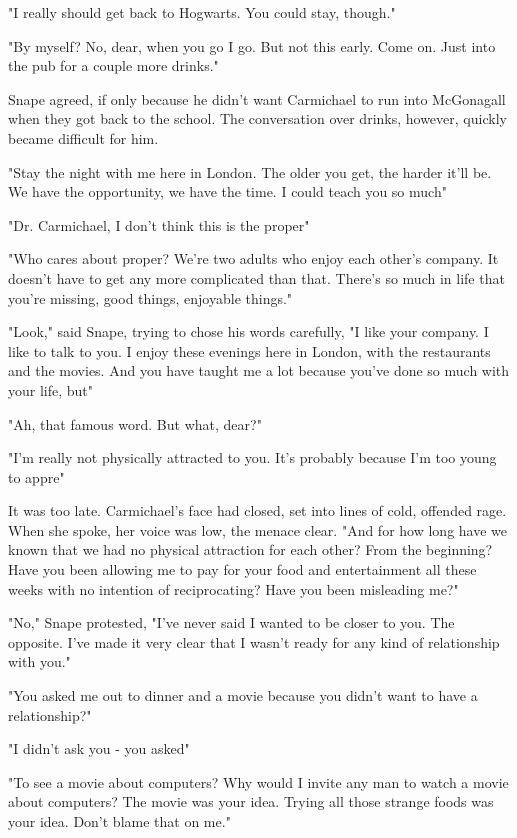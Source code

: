 "I really should get back to Hogwarts. You could stay, though."

"By myself? No, dear, when you go I go. But not this early. Come on. Just into the pub for a couple more drinks."

Snape agreed, if only because he didn't want Carmichael to run into McGonagall when they got back to the school. The conversation over drinks, however, quickly became difficult for him.

"Stay the night with me here in London. The older you get, the harder it'll be. We have the opportunity, we have the time. I could teach you so much{\el}"

"Dr. Carmichael, I don't think this is the proper{\el}"

"Who cares about proper? We're two adults who enjoy each other's company. It doesn't have to get any more complicated than that. There's so much in life that you're missing, good things, enjoyable things."

"Look," said Snape, trying to chose his words carefully, "I like your company. I like to talk to you. I enjoy these evenings here in London, with the restaurants and the movies. And you have taught me a lot because you've done so much with your life, but{\el}"

"Ah, that famous word. But what, dear?"

"I'm really not physically attracted to you. It's probably because I'm too young to appre{\el}"

It was too late. Carmichael's face had closed, set into lines of cold, offended rage. When she spoke, her voice was low, the menace clear. "And for how long have we known that we had no physical attraction for each other? From the beginning? Have you been allowing me to pay for your food and entertainment all these weeks with no intention of reciprocating? Have you been misleading me?"

"No," Snape protested, "I've never said I wanted to be closer to you. The opposite. I've made it very clear that I wasn't ready for any kind of relationship with you."

"You asked me out to dinner and a movie because you didn't want to have a relationship?"

"I didn't ask you - you asked{\el}"

"To see a movie about computers? Why would I invite any man to watch a movie about computers? The movie was your idea. Trying all those strange foods was your idea. Don't blame that on me."

